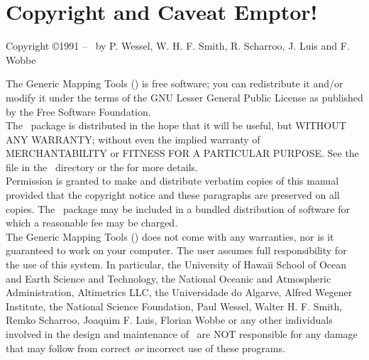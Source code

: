 
\chapter*{Copyright and Caveat Emptor!}

\begin{center}
Copyright \copyright 1991 -- \GMTDOCYEAR\ by P. Wessel, W. H. F. Smith, R. Scharroo, J. Luis and F. Wobbe
\end{center}

\vspace{\baselineskip}

The Generic Mapping Tools (\GMT) is free software; you can redistribute
it and/or modify it under the terms of the GNU Lesser General Public License
as published by the Free Software Foundation. \\

The \GMT\ package is distributed in the hope that it will be useful, but
WITHOUT ANY WARRANTY; without even the implied warranty of
MERCHANTABILITY or FITNESS FOR A PARTICULAR PURPOSE.  See the
file  in the \GMT\ directory or the
for more details. \\

Permission is granted to make and distribute verbatim copies of this
manual provided that the copyright notice and these paragraphs are
preserved on all copies.  The \GMT\ package may be included in a bundled
distribution of software for which a reasonable fee may be charged. \\

The Generic Mapping Tools (\GMT) does not come with any warranties,
nor is it guaranteed to work on your computer.  The user assumes full
responsibility for the use of this system. In particular, the University
of Hawaii School of Ocean and Earth Science and Technology, the National
Oceanic and Atmospheric Administration, Altimetrics LLC, the Universidade
do Algarve, Alfred Wegener Institute, the National Science Foundation,
Paul Wessel, Walter H. F. Smith, Remko Scharroo, Joaquim F. Luis, Florian
Wobbe or any other individuals involved in the design and maintenance of
\GMT\ are NOT responsible for any damage that may follow from correct
\emph{or} incorrect use of these programs.

